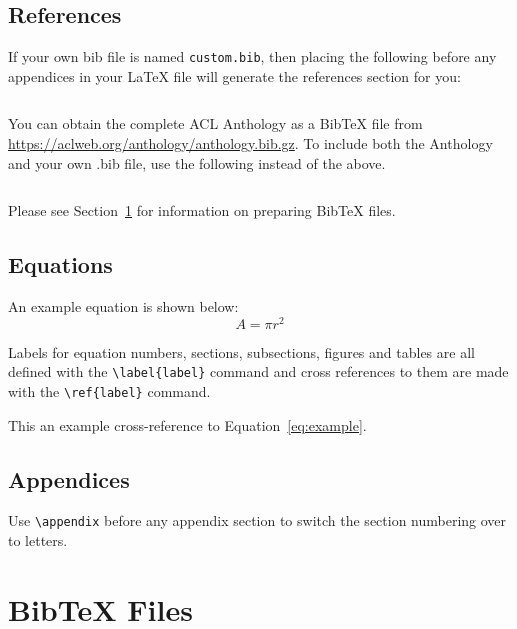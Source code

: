 \documentclass[11pt, onecolumn]{article}
\begin{document}
\subsection{References}

\nocite{Ando2005,andrew2007scalable,rasooli-tetrault-2015}

If your own bib file is named \texttt{custom.bib}, then placing the following before any appendices in your \LaTeX{} file will generate the references section for you:
\begin{quote}
\begin{verbatim}

\end{verbatim}
\end{quote}

You can obtain the complete ACL Anthology as a Bib\TeX{} file from \url{https://aclweb.org/anthology/anthology.bib.gz}.
To include both the Anthology and your own .bib file, use the following instead of the above.
\begin{quote}
\begin{verbatim}

\end{verbatim}
\end{quote}

Please see Section~\ref{sec:bibtex} for information on preparing Bib\TeX{} files.

\subsection{Equations}

An example equation is shown below:
\begin{equation}
  \label{eq:example}
  A = \pi r^2
\end{equation}

Labels for equation numbers, sections, subsections, figures and tables
are all defined with the \verb|\label{label}| command and cross references
to them are made with the \verb|\ref{label}| command.

This an example cross-reference to Equation~\ref{eq:example}.

\subsection{Appendices}

Use \verb|\appendix| before any appendix section to switch the section numbering over to letters.

\section{Bib\TeX{} Files}
\label{sec:bibtex}
\end{document}

